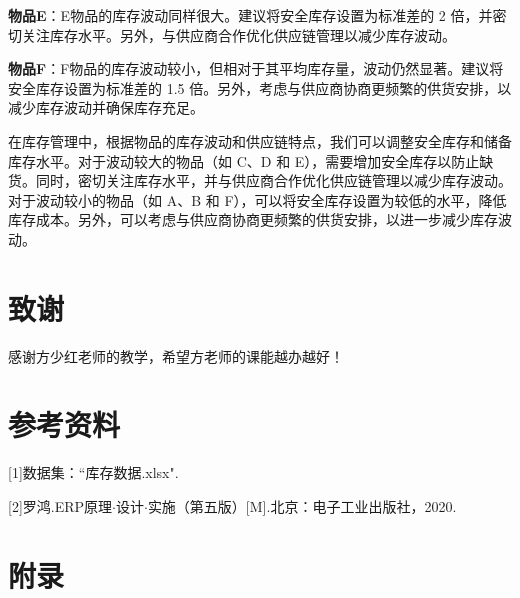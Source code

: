 \documentclass[12pt,a4paper]{article}
\begin{document}
\textbf{物品E}：E物品的库存波动同样很大。建议将安全库存设置为标准差的 2 倍，并密切关注库存水平。另外，与供应商合作优化供应链管理以减少库存波动。

\textbf{物品F}：F物品的库存波动较小，但相对于其平均库存量，波动仍然显著。建议将安全库存设置为标准差的 1.5 倍。另外，考虑与供应商协商更频繁的供货安排，以减少库存波动并确保库存充足。

在库存管理中，根据物品的库存波动和供应链特点，我们可以调整安全库存和储备库存水平。对于波动较大的物品（如 C、D 和 E），需要增加安全库存以防止缺货。同时，密切关注库存水平，并与供应商合作优化供应链管理以减少库存波动。
对于波动较小的物品（如 A、B 和 F），可以将安全库存设置为较低的水平，降低库存成本。另外，可以考虑与供应商协商更频繁的供货安排，以进一步减少库存波动。



\section{致谢}
感谢方少红老师的教学，希望方老师的课能越办越好！

\section{参考资料}
[1]数据集：“库存数据.xlsx".

[2]罗鸿.ERP原理$\cdot$设计$\cdot$实施（第五版）[M].北京：电子工业出版社，2020.

\section{附录}
\end{document}
